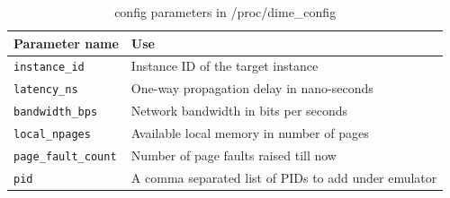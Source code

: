 \begin{table}[]
	\centering
	\caption{{\dime} config parameters in /proc/dime\_config }
	\label{tab:kmodule_param}
	\begin{tabular}{ll}
		\hline
		\textbf{Parameter name} & \textbf{Use} \\ \hline
		\verb|instance_id| & Instance ID of the target {\dime} instance \\
		\verb|latency_ns| & One-way propagation delay in nano-seconds \\
		\verb|bandwidth_bps| & Network bandwidth in bits per seconds \\
		\verb|local_npages| & Available local memory in number of pages \\
		\verb|page_fault_count| & Number of page faults raised till now \\
		\verb|pid| & A comma separated list of PIDs to add under emulator \\ \hline
	\end{tabular}
\end{table}

